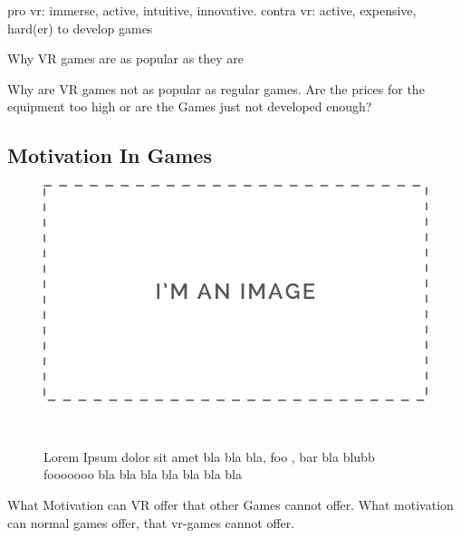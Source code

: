pro vr: immerse, active, intuitive, innovative.
contra vr: active, expensive, hard(er) to develop games

Why VR games are as popular as they are

Why are VR games not as popular as regular games. Are the prices for the equipment too high or are the Games just not developed enough?


\subsection{Motivation In Games}

\begin{figure}
	\centering
	\includegraphics[width=0.9\columnwidth]{./figures/placeholder}
	\caption[blabla]{Lorem Ipsum dolor sit amet bla bla bla, foo , bar bla blubb fooooooo bla bla bla bla bla bla bla}~\label{fig:foobar3}
\end{figure}


What Motivation can VR offer that other Games cannot offer. What motivation can normal games offer, that vr-games cannot offer.

